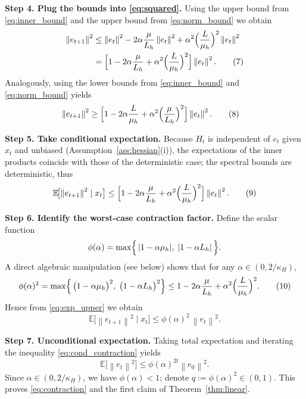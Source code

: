 \documentclass{article}
\newcommand{\E}{\mathbb{E}}
\newcommand{\norm}[1]{\left\|#1\right\|}
\begin{document}
\noindent\textbf{Step 4. Plug the bounds into \eqref{eq:squared}.}  
Using the upper bound from \eqref{eq:inner_bound} and the upper bound from \eqref{eq:norm_bound} we obtain
\begin{align}
\norm{e_{t+1}}^{2}
&\le
\norm{e_{t}}^{2}
-2\alpha\frac{\mu}{L_{h}}\norm{e_{t}}^{2}
+\alpha^{2}\Bigl(\frac{L}{\mu_{h}}\Bigr)^{2}\norm{e_{t}}^{2}\nonumber\\
&=
\Bigl[1-2\alpha\frac{\mu}{L_{h}}+\alpha^{2}\Bigl(\frac{L}{\mu_{h}}\Bigr)^{2}\Bigr]\norm{e_{t}}^{2}.
\tag{7}
\label{eq:upper_q}
\end{align}
Analogously, using the lower bounds from \eqref{eq:inner_bound} and \eqref{eq:norm_bound} yields
\begin{align}
\norm{e_{t+1}}^{2}
&\ge
\Bigl[1-2\alpha\frac{L}{\mu_{h}}+\alpha^{2}\Bigl(\frac{\mu}{L_{h}}\Bigr)^{2}\Bigr]\norm{e_{t}}^{2}.
\tag{8}
\label{eq:lower_q}
\end{align}

\noindent\textbf{Step 5. Take conditional expectation.}  
Because $H_{t}$ is independent of $e_{t}$ given $x_{t}$ and unbiased (Assumption~\ref{ass:hessian}(i)), the expectations of the inner products coincide with those of the deterministic case; the spectral bounds are deterministic, thus
\[
\E\!\bigl[\norm{e_{t+1}}^{2}\mid x_{t}\bigr]
\le
\Bigl[1-2\alpha\frac{\mu}{L_{h}}+\alpha^{2}\Bigl(\frac{L}{\mu_{h}}\Bigr)^{2}\Bigr]\norm{e_{t}}^{2}.
\tag{9}
\label{eq:exp_upper}
\]

\noindent\textbf{Step 6. Identify the worst‑case contraction factor.}  
Define the scalar function
\[
\phi(\alpha)=\max\Bigl\{\,|1-\alpha\mu_{h}|,\;|1-\alpha L_{h}|\,\Bigr\}.
\]
A direct algebraic manipulation (see below) shows that for any $\alpha\in(0,2/\kappa_{H})$,
\[
\phi(\alpha)^{2}
=
\max\Bigl\{\,\bigl(1-\alpha\mu_{h}\bigr)^{2},\;\bigl(1-\alpha L_{h}\bigr)^{2}\Bigr\}
\le
1-2\alpha\frac{\mu}{L_{h}}+\alpha^{2}\Bigl(\frac{L}{\mu_{h}}\Bigr)^{2}.
\tag{10}
\label{eq:phi_bound}
\]
Hence from \eqref{eq:exp_upper} we obtain
\[
\E\!\bigl[\norm{e_{t+1}}^{2}\mid x_{t}\bigr]\le \phi(\alpha)^{2}\,\norm{e_{t}}^{2}.
\tag{11}
\label{eq:cond_contraction}
\]

\noindent\textbf{Step 7. Unconditional expectation.}  
Taking total expectation and iterating the inequality \eqref{eq:cond_contraction} yields
\[
\E\!\bigl[\norm{e_{t}}^{2}\bigr]\le \phi(\alpha)^{2t}\norm{e_{0}}^{2}.
\tag{12}
\label{eq:final_linear}
\]
Since $\alpha\in(0,2/\kappa_{H})$, we have $\phi(\alpha)<1$; denote $q:=\phi(\alpha)^{2}\in(0,1)$. This proves \eqref{eq:contraction} and the first claim of Theorem~\ref{thm:linear}.
\end{document}
